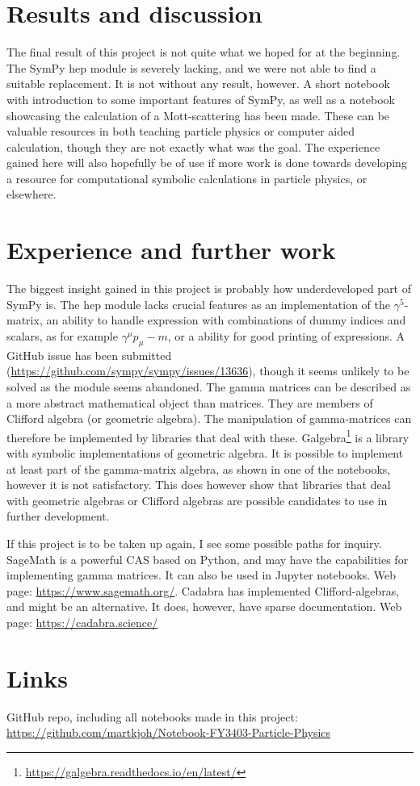 \documentclass{article}
\begin{document}
    \section*{Results and discussion}
    The final result of this project is not quite what we hoped for at the beginning.
    The SymPy hep module is severely lacking, and we were not able to find a suitable replacement.
    It is not without any result, however.
    A short notebook with introduction to some important features of SymPy, as well as a notebook showcasing the calculation of a Mott-scattering has been made.
    These can be valuable resources in both teaching particle physics or computer aided calculation, though they are not exactly what was the goal.
    The experience gained here will also hopefully be of use if more work is done towards developing a resource for computational symbolic calculations in particle physics, or elsewhere.
    \section*{Experience and further work}
    The biggest insight gained in this project is probably how underdeveloped part of SymPy is.
    The hep module lacks crucial features as an implementation of the $\gamma^5$-matrix, an ability to handle expression with combinations of dummy indices and scalars, as for example $\gamma^\mu p_\mu - m$, or a ability for good printing of expressions.
    A GitHub issue has been submitted (\url{https://github.com/sympy/sympy/issues/13636}), though it seems unlikely to be solved as the module seems abandoned.
    The gamma matrices can be described as a more abstract mathematical object than matrices.
    They are members of Clifford algebra (or geometric algebra).
    The manipulation of gamma-matrices can therefore be implemented by libraries that deal with these.
    Galgebra\footnote{\url{https://galgebra.readthedocs.io/en/latest/}} is a library with symbolic implementations of geometric algebra.
    It is possible to implement at least part of the gamma-matrix algebra, as shown in one of the notebooks, however it is not satisfactory.
    This does however show that libraries that deal with geometric algebras or Clifford algebras are possible candidates to use in further development.
    

    If this project is to be taken up again, I see some possible paths for inquiry.
    SageMath is a powerful CAS based on Python, and may have the capabilities for implementing gamma matrices.
    It can also be used in Jupyter notebooks.
    Web page: \url{https://www.sagemath.org/}.
    Cadabra has implemented Clifford-algebras, and might be an alternative.
    It does, however, have sparse documentation.
    Web page: \url{https://cadabra.science/ }

    \section*{Links}
    GitHub repo, including all notebooks made in this project:\\
    \url{https://github.com/martkjoh/Notebook-FY3403-Particle-Physics}

    \printbibliography
\end{document}

